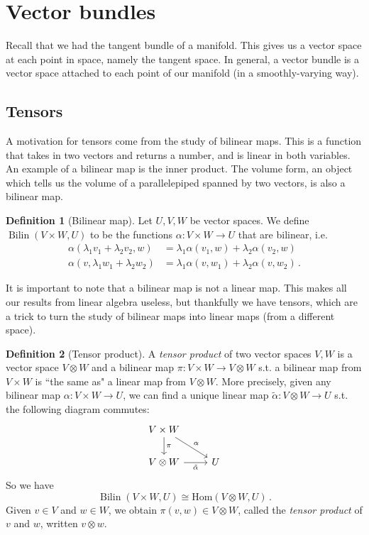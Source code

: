 \documentclass[a4paper,11pt]{article}
\theoremstyle{definition}
\newtheorem*{defn}{Definition}
\DeclareMathOperator{\Bilin}{Bilin}
\numberwithin{equation}{section}
\begin{document}
\section{Vector bundles}
Recall that we had the tangent bundle of a manifold. This gives us a vector space at each point in space, namely the tangent space. In general, a vector bundle is a vector space attached to each point of our manifold (in a smoothly-varying way).

\subsection{Tensors}
A motivation for tensors come from the study of bilinear maps. This is a function that takes in two vectors and returns a number, and is linear in both variables. An example of a bilinear map is the inner product. The volume form, an object which tells us the volume of a parallelepiped spanned by two vectors, is also a bilinear map.

\begin{defn}[Bilinear map]
Let $U,V,W$ be vector spaces. We define $\Bilin(V\times W,U)$ to be the functions $\alpha:V\times W\rightarrow U$ that are bilinear, i.e.
\begin{align*}
    \alpha(\lambda_1v_1+\lambda_2v_2,w)&=\lambda_1\alpha(v_1,w)+\lambda_2\alpha(v_2,w)\\
    \alpha(v,\lambda_1w_1+\lambda_2w_2)&=\lambda_1\alpha(v,w_1)+\lambda_2\alpha(v,w_2)\,.
\end{align*}
\end{defn}

It is important to note that a bilinear map is not a linear map. This makes all our results from linear algebra useless, but thankfully we have tensors, which are a trick to turn the study of bilinear maps into linear maps (from a different space).

\begin{defn}[Tensor product]
A \emph{tensor product} of two vector spaces $V,W$ is a vector space $V\otimes W$ and a bilinear map $\pi:V\times W\rightarrow V\otimes W$ s.t. a bilinear map from $V\times W$ is ``the same as" a linear map from $V\otimes W$. More precisely, given any bilinear map $\alpha:V\times W\rightarrow U$, we can find a unique linear map $\tilde{\alpha}:V\otimes W\rightarrow U$ s.t. the following diagram commutes:
\[
\begin{tikzcd}
V\times W\arrow{d}{\pi}\arrow{dr}{\alpha}\\
V\otimes W\arrow[swap]{r}{\tilde{\alpha}}&U
\end{tikzcd}
\]
So we have 
\[
\Bilin(V\times W,U)\cong\text{Hom}(V\otimes W,U)\,.
\]
Given $v\in V$ and $w\in W$, we obtain $\pi(v,w)\in V\otimes W$, called the \emph{tensor product} of $v$ and $w$, written $v\otimes w$.
\end{defn}
\end{document}
